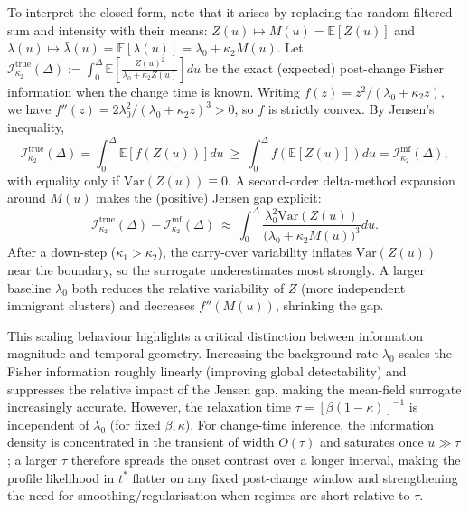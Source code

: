 \documentclass{article}
\theoremstyle{plain}
\theoremstyle{definition}
\newcommand{\E}{\mathbb{E}}
\newcommand{\Var}{\mathrm{Var}}
\newcommand{\1}{\mathbf{1}}
\begin{document}
    To interpret the closed form, note that it arises by replacing the random filtered sum and intensity with their means: $Z(u)\mapsto M(u)=\E[Z(u)]$ and $\lambda(u)\mapsto\bar\lambda(u)=\E[\lambda(u)]=\lambda_0+\kappa_2 M(u)$. Let $\mathcal I_{\kappa_2}^{\text{true}}(\Delta):=\int_0^\Delta \E \left[\frac{Z(u)^2}{\lambda_0+\kappa_2 Z(u)}\right]du$ be the exact (expected) post-change Fisher information when the change time is known. Writing $f(z)=z^2/(\lambda_0+\kappa_2 z)$, we have $f''(z)=2\lambda_0^2/(\lambda_0+\kappa_2 z)^3>0$, so $f$ is strictly convex. By Jensen's inequality,
    \[
    \mathcal I_{\kappa_2}^{\text{true}}(\Delta)=\int_0^\Delta \E[f(Z(u))] du
    \ \ge\ \int_0^\Delta f(\E[Z(u)]) du
    =\mathcal I_{\kappa_2}^{\mathrm{mf}}(\Delta),
    \]
    with equality only if $\Var(Z(u))\equiv0$. A second-order delta-method expansion around $M(u)$ makes the (positive) Jensen gap explicit:
    \[
    \mathcal I_{\kappa_2}^{\text{true}}(\Delta)-\mathcal I_{\kappa_2}^{\mathrm{mf}}(\Delta)
    \ \approx\ \int_{0}^{\Delta}\frac{\lambda_0^2 \Var(Z(u))}{\big(\lambda_0+\kappa_2 M(u)\big)^3} du.
    \]
    After a down-step ($\kappa_1>\kappa_2$), the carry-over variability inflates $\Var(Z(u))$ near the boundary, so the surrogate underestimates most strongly. A larger baseline $\lambda_0$ both reduces the relative variability of $Z$ (more independent immigrant clusters) and decreases $f''(M(u))$, shrinking the gap. 
    
    This scaling behaviour highlights a critical distinction between information magnitude and temporal geometry. Increasing the background rate $\lambda_0$ scales the Fisher information roughly linearly (improving global detectability) and suppresses the relative impact of the Jensen gap, making the mean-field surrogate increasingly accurate. However, the relaxation time $\tau=[\beta(1-\kappa)]^{-1}$ is independent of $\lambda_0$ (for fixed $\beta,\kappa$). For change-time inference, the information density is concentrated in the transient of width $O(\tau)$ and saturates once $u\gg\tau$; a larger $\tau$ therefore spreads the onset contrast over a longer interval, making the profile likelihood in $t^\ast$ flatter on any fixed post-change window and strengthening the need for smoothing/regularisation when regimes are short relative to $\tau$. %
    
\end{document}
